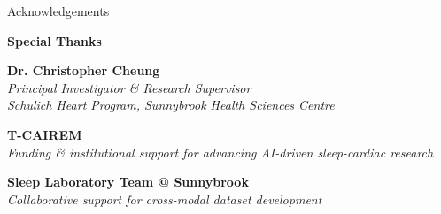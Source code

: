 \documentclass[aspectratio=169,11pt]{beamer}
\begin{document}
\begin{frame}{Acknowledgements}
  \begin{center}
    \vspace{1em}
    
    \textbf{\Large Special Thanks}
    
    \vspace{1.5em}
    
    \textbf{Dr. Christopher Cheung}\\
    \textcolor{tcairemblue}{\textit{Principal Investigator \& Research Supervisor}}\\
    \textcolor{tcairemblue}{\textit{Schulich Heart Program, Sunnybrook Health Sciences Centre}}
    
    \vspace{1.5em}
    
    \textbf{T-CAIREM}\\
    \textcolor{tcairemred}{\textit{Funding \& institutional support for advancing AI-driven sleep-cardiac research}}

    
    \vspace{1em}
    
    \textbf{Sleep Laboratory Team @ Sunnybrook}\\
    \textcolor{tcairemgreen}{\textit{Collaborative support for cross-modal dataset development}}
    
    \vspace{1em}
    
    
  \end{center}
\end{frame}
\end{document}
